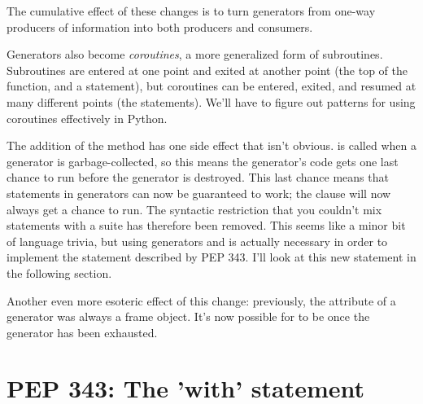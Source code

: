 \documentclass{howto}
\begin{document}
The cumulative effect of these changes is to turn generators from
one-way producers of information into both producers and consumers.

Generators also become \emph{coroutines}, a more generalized form of
subroutines.  Subroutines are entered at one point and exited at
another point (the top of the function, and a 
statement), but coroutines can be entered, exited, and resumed at
many different points (the  statements).  We'll have to
figure out patterns for using coroutines effectively in Python.

The addition of the  method has one side effect that
isn't obvious.   is called when a generator is
garbage-collected, so this means the generator's code gets one last
chance to run before the generator is destroyed.  This last chance
means that  statements in generators can now be
guaranteed to work; the  clause will now always get a
chance to run.  The syntactic restriction that you couldn't mix
 statements with a  suite has
therefore been removed.  This seems like a minor bit of language
trivia, but using generators and  is actually
necessary in order to implement the   statement
described by PEP 343.  I'll look at this new statement in the following 
section.

Another even more esoteric effect of this change: previously, the
 attribute of a generator was always a frame object.
It's now possible for  to be 
once the generator has been exhausted.

\begin{seealso}




\end{seealso}


\section{PEP 343: The 'with' statement\label{pep-343}}
\end{document}
